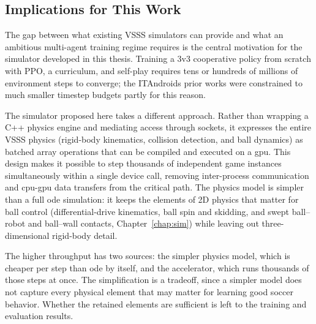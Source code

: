 \subsection{Implications for This Work}

The gap between what existing VSSS simulators can provide and what an
ambitious multi-agent training regime requires is the central motivation for
the simulator developed in this thesis.  Training a 3v3 cooperative policy
from scratch with PPO, a curriculum, and self-play requires tens or
hundreds of millions of environment steps to converge; the ITAndroids prior
works were constrained to much smaller timestep budgets partly for this reason.

The simulator proposed here takes a different approach.  Rather than wrapping
a C++ physics engine and mediating access through sockets, it expresses the
entire VSSS physics (rigid-body kinematics, collision detection, and ball
dynamics) as batched array operations that can be compiled and executed
on a \gls{gpu}.  This design makes it possible to step thousands of
independent game instances simultaneously within a single device call,
removing inter-process communication and \gls{cpu}-\gls{gpu} data transfers from the
critical path.  The physics model is simpler than a full \gls{ode}
simulation: it keeps the elements of 2D physics that matter for ball control
(differential-drive kinematics, ball spin and skidding, and swept ball--robot and ball--wall contacts, Chapter~\ref{chap:sim})
while leaving out three-dimensional rigid-body detail.

The higher throughput has two sources: the simpler physics model, which is cheaper per step than \gls{ode} by itself, and the accelerator, which runs
thousands of those steps at once.  The simplification is a tradeoff, since a simpler model does not capture every physical element that may matter for learning good soccer behavior.  Whether the retained elements are sufficient is left to the training and evaluation results.
